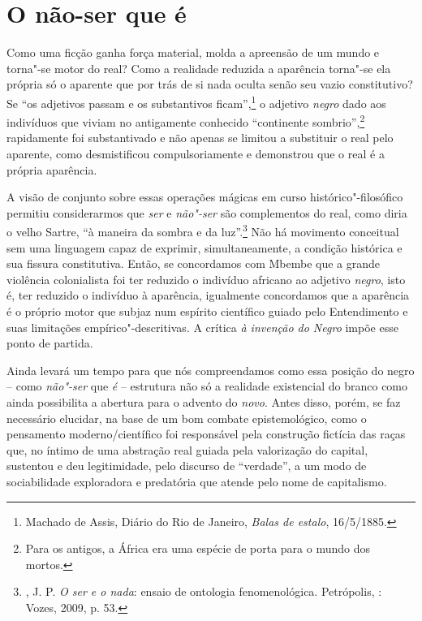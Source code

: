 \chapter{O não-ser que é}

Como uma ficção ganha força material, molda a apreensão de um mundo e
torna"-se motor do real? Como a realidade reduzida a aparência torna"-se
ela própria só o aparente que por trás de si nada oculta senão seu vazio
constitutivo? Se ``os adjetivos passam e os substantivos
ficam'',\footnote{Machado de Assis, Diário do Rio de Janeiro, \emph{Balas de estalo}, 16/5/1885.} o adjetivo \emph{negro} dado aos
indivíduos que viviam no antigamente conhecido ``continente
sombrio'',\footnote{Para os antigos, a África era uma espécie de porta
  para o mundo dos mortos.} rapidamente foi substantivado e
não apenas se limitou a substituir o real pelo aparente, como
desmistificou compulsoriamente e demonstrou que o real é a própria
aparência.

A visão de conjunto sobre essas operações mágicas em curso
histórico"-filosófico permitiu considerarmos que \emph{ser} e
\emph{não"-ser} são complementos do real, como diria o velho Sartre, ``à
maneira da sombra e da luz''.\footnote{, J. P. \emph{O ser e o
  nada}: ensaio de ontologia fenomenológica. Petrópolis, : Vozes,
  2009, p. 53.} Não há movimento conceitual sem uma linguagem capaz de
exprimir, simultaneamente, a condição histórica e sua fissura
constitutiva. Então, se concordamos com Mbembe que a grande violência
colonialista foi ter reduzido o indivíduo africano ao adjetivo
\emph{negro}, isto é, ter reduzido o indivíduo à aparência, igualmente
concordamos que a aparência é o próprio motor que subjaz num espírito
científico guiado pelo Entendimento e suas limitações
empírico"-descritivas. A crítica \emph{à invenção do Negro} impõe esse
ponto de partida.

Ainda levará um tempo para que nós compreendamos como essa posição do
negro -- como \emph{não"-ser} que \emph{é} -- estrutura não só a
realidade existencial do branco como ainda possibilita a abertura para o
advento do \emph{novo}. Antes disso, porém, se faz necessário elucidar,
na base de um bom combate epistemológico, como o pensamento
moderno/científico foi responsável pela construção fictícia das raças
que, no íntimo de uma abstração real guiada pela valorização do capital,
sustentou e deu legitimidade, pelo discurso de ``verdade'', a um modo de
sociabilidade exploradora e predatória que atende pelo nome de
capitalismo.

